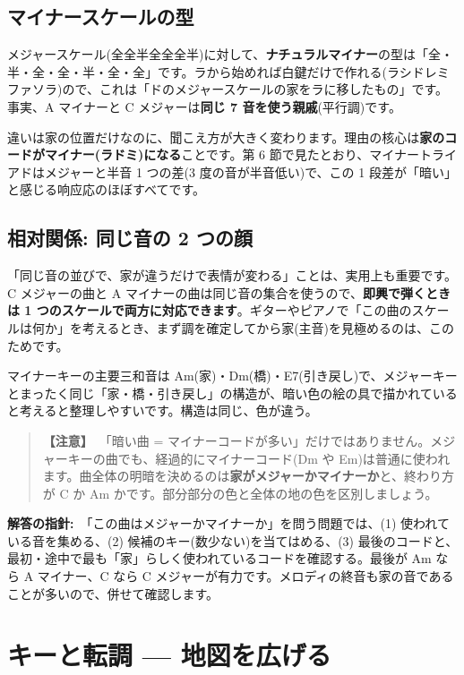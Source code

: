 \documentclass{article}
\begin{document}
\subsection{マイナースケールの型}

メジャースケール(全全半全全全半)に対して、\textbf{ナチュラルマイナー}の型は「全・半・全・全・半・全・全」です。ラから始めれば白鍵だけで作れる(ラシドレミファソラ)ので、これは「ドのメジャースケールの家をラに移したもの」です。事実、A マイナーと C メジャーは\textbf{同じ 7 音を使う親戚}(平行調)です。

違いは家の位置だけなのに、聞こえ方が大きく変わります。理由の核心は\textbf{家のコードがマイナー(ラドミ)になる}ことです。第 6 節で見たとおり、マイナートライアドはメジャーと半音 1 つの差(3 度の音が半音低い)で、この 1 段差が「暗い」と感じる响应応のほぼすべてです。

\subsection{相对関係: 同じ音の 2 つの顔}

「同じ音の並びで、家が違うだけで表情が変わる」ことは、実用上も重要です。C メジャーの曲と A マイナーの曲は同じ音の集合を使うので、\textbf{即興で弾くときは 1 つのスケールで両方に対応できます}。ギターやピアノで「この曲のスケールは何か」を考えるとき、まず調を確定してから家(主音)を見極めるのは、このためです。

マイナーキーの主要三和音は Am(家)・Dm(橋)・E7(引き戻し)で、メジャーキーとまったく同じ「家・橋・引き戻し」の構造が、暗い色の絵の具で描かれていると考えると整理しやすいです。構造は同じ、色が違う。

\begin{quote}
\textbf{【注意】}\ 「暗い曲 = マイナーコードが多い」だけではありません。メジャーキーの曲でも、経過的にマイナーコード(Dm や Em)は普通に使われます。曲全体の明暗を決めるのは\textbf{家がメジャーかマイナーか}と、終わり方が C か Am かです。部分部分の色と全体の地の色を区別しましょう。
\end{quote}

\textbf{解答の指針:}\ 「この曲はメジャーかマイナーか」を問う問題では、(1) 使われている音を集める、(2) 候補のキー(数少ない)を当てはめる、(3) 最後のコードと、最初・途中で最も「家」らしく使われているコードを確認する。最後が Am なら A マイナー、C なら C メジャーが有力です。メロディの終音も家の音であることが多いので、併せて確認します。

\section{キーと転調 — 地図を広げる}
\end{document}
